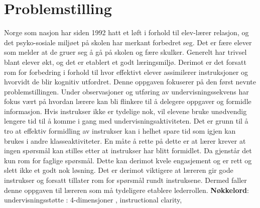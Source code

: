 \documentclass[main.tex]{subfiles}
\begin{document}
\section*{Problemstilling}      
Norge som nasjon har siden 1992 hatt et l\o ft i forhold til elev-l\ae rer 
relasjon, og det psyko-sosiale milj\o et p\aa\hspace{1mm} skolen har merkant 
forbedret seg. Det er f\ae re elever som melder at de gruer seg \aa\hspace{1mm} 
g\aa\hspace{1mm} p\aa\hspace{1mm} skolen og f\ae re skulker. Generelt har trivsel 
blant elever \o kt, og det er etablert et godt l\ae ringsmilj\o . Derimot er det 
forsatt rom for forbedring i forhold til hvor effektivt elever assimilerer 
instruksjoner og hvorvidt de blir kognitiv utfordret. Denne oppgaven fokuserer 
p\aa\hspace{1mm} den f\o rst nevnte problemstillingen. Under observasjoner og 
utf\o ring av undervisningssekvens har fokus v\ae rt p\aa\hspace{1mm} hvordan 
l\ae rere kan bli flinkere til \aa\hspace{1mm} delegere oppgaver og formidle 
informasjon. Hvis instrukser ikke er tydelige nok, vil elevene bruke un\o dvendig 
lengere tid til \aa\hspace{1mm} komme i gang med undervisningsaktiviteten. Det 
er grunn til \aa\hspace{1mm} tro at effektiv formidling av instrukser kan i 
helhet spare tid som igjen kan brukes i andre klasseaktiviteter. En m\aa te
\aa\hspace{1mm} rette p\aa\hspace{1mm} dette er at l\ae rer krever at ingen
sp\o rsm\aa l kan stilles etter at instrukser har blitt formidlet. Da gjenst\aa r
det kun rom for faglige sp\o rsm\aa l. Dette kan derimot kvele engasjement og er
rett og slett ikke et godt nok l\o sning. Det er derimot viktigere at l\ae reren
gir gode instrukser og forsatt tillater rom for sp\o rsm\aa l rundt instruksene.
Dermed faller denne oppgaven til l\ae reren som m\aa\hspace{1mm} tydeligere
etablere lederrollen.
\newline
\newline
\hspace{-7mm}\textbf{N\o kkelord}: undervisningsst\o tte : 4-dimensjoner , 
instructional clarity,       

\newpage\null
\end{document}
